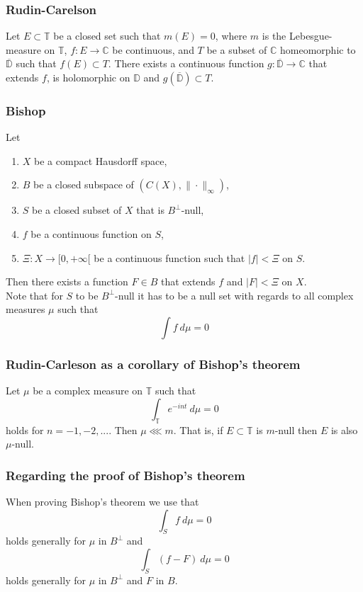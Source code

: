\documentclass{beamer}
\begin{document}
\begin{frame}
	\frametitle{Rudin-Carelson}
\begin{theorem}
Let
	$E \subset \mathbb{T}$ be a closed set such that $m(E) = 0$, where $m$ is the Lebesgue-measure on $\mathbb{T}$, 
	$f \colon E \rightarrow \mathbb{C}$ be continuous,
	and $T$ be a subset of $\mathbb{C}$ homeomorphic to $\overline{\mathbb{D}}$ such that $f(E) \subset T$.
There exists a continuous function $g \colon \overline{\mathbb{D}} \rightarrow \mathbb{C}$ that extends $f$, is holomorphic on $\mathbb{D}$ and $g(\overline{\mathbb{D}}) \subset T$.
\end{theorem}
\end{frame}

\begin{frame}
	\frametitle{Bishop}
\begin{theorem}[Bishop]
Let
\begin{enumerate}
\item $X$ be a compact Hausdorff space,
\item $B$ be a closed subspace of $(C(X), \| \cdot \|_{\infty})$,
\item $S$ be a closed subset of $X$ that is $B^{\bot}$-null,
\item $f$ be a continuous function on $S$,
\item $\Xi: X \rightarrow [0, +\infty[$ be a continuous function such that $|f| < \Xi$ on $S$.
\end{enumerate}
Then there exists a function $F \in B$ that extends $f$ and $|F| < \Xi$ on $X$. \\
Note that for $S$ to be $B^{\bot}$-null it has to be a null set with regards to all complex measures $\mu$ such that
\[
	\int f\ d\mu = 0 \tag*{for all $f$ in $B$.}
\]
\end{theorem}
\end{frame}

\begin{frame}
	\frametitle{Rudin-Carleson as a corollary of Bishop's theorem}
\begin{theorem}
Let $\mu$ be a complex measure on $\mathbb{T}$ such that
\[
	\int_{\mathbb{T}} e^{-int}\ d\mu = 0
\]
holds for $n = -1, -2, ...$.
Then $\mu \lll m$.
That is, if $E \subset \mathbb{T}$ is $m$-null then $E$ is also $\mu$-null.
\end{theorem}
\end{frame}

\begin{frame}
	\frametitle{Regarding the proof of Bishop's theorem}
When proving Bishop's theorem we use that
\[
	\int_S f\ d\mu = 0
\]
holds generally for $\mu$ in $B^{\bot}$ and
\[
	\int_S (f - F)\ d\mu = 0
\]
holds generally for $\mu$ in $B^{\bot}$ and $F$ in $B$.
\end{frame}
\end{document}
